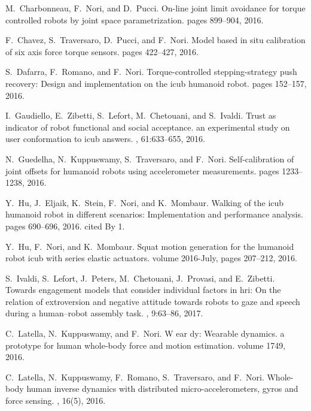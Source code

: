 \documentclass[12pt,a4paper,twoside]{article}
\begin{document}
\begin{thebibliography}{}
M.~Charbonneau, F.~Nori, and D.~Pucci.
\newblock On-line joint limit avoidance for torque controlled robots by joint
  space parametrization.
\newblock pages 899--904, 2016.
 

F.~Chavez, S.~Traversaro, D.~Pucci, and F.~Nori.
\newblock Model based in situ calibration of six axis force torque sensors.
\newblock pages 422--427, 2016.
 

S.~Dafarra, F.~Romano, and F.~Nori.
\newblock Torque-controlled stepping-strategy push recovery: Design and
  implementation on the icub humanoid robot.
\newblock pages 152--157, 2016.
 

I.~Gaudiello, E.~Zibetti, S.~Lefort, M.~Chetouani, and S.~Ivaldi.
\newblock Trust as indicator of robot functional and social acceptance. an
  experimental study on user conformation to icub answers.
, 61:633--655, 2016.

N.~Guedelha, N.~Kuppuswamy, S.~Traversaro, and F.~Nori.
\newblock Self-calibration of joint offsets for humanoid robots using
  accelerometer measurements.
\newblock pages 1233--1238, 2016.
 

Y.~Hu, J.~Eljaik, K.~Stein, F.~Nori, and K.~Mombaur.
\newblock Walking of the icub humanoid robot in different scenarios:
  Implementation and performance analysis.
\newblock pages 690--696, 2016.
\newblock cited By 1.

Y.~Hu, F.~Nori, and K.~Mombaur.
\newblock Squat motion generation for the humanoid robot icub with series
  elastic actuators.
\newblock volume 2016-July, pages 207--212, 2016.
 

S.~Ivaldi, S.~Lefort, J.~Peters, M.~Chetouani, J.~Provasi, and E.~Zibetti.
\newblock Towards engagement models that consider individual factors in hri: On
  the relation of extroversion and negative attitude towards robots to gaze and
  speech during a human--robot assembly task.
, 9:63--86, 2017.

C.~Latella, N.~Kuppuswamy, and F.~Nori.
\newblock W ear dy: Wearable dynamics. a prototype for human whole-body force
  and motion estimation.
\newblock volume 1749, 2016.
 

C.~Latella, N.~Kuppuswamy, F.~Romano, S.~Traversaro, and F.~Nori.
\newblock Whole-body human inverse dynamics with distributed
  micro-accelerometers, gyros and force sensing.
, 16(5), 2016.
 


\end{thebibliography}
\end{document}
